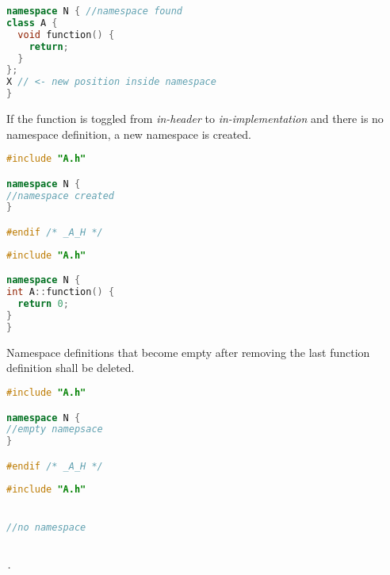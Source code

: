 \begin{lstlisting}[caption={A.h},label={namspac},language=C++]
namespace N { //namespace found
class A {
  void function() {
    return;
  }
};
X // <- new position inside namespace
}
\end{lstlisting}

If the function is toggled from \textit{in-header} to \textit{in-implementation}
and there is no namespace definition, a new namespace is created.

\vspace{0.5cm}
\begin{minipage}{.48\textwidth}
\lstset{xrightmargin=0.5cm}
\begin{lstlisting}[caption={A.cpp, new name-\\space created},
label={addnamespace1}, language=C++]
#include "A.h"

namespace N {
//namespace created
}

#endif /* _A_H */
\end{lstlisting}
\end{minipage}%
\begin{minipage}{.48\textwidth}
\lstset{xleftmargin=0.5cm}
\begin{lstlisting}[caption={A.cpp, insterted \\function},
label={addnamespace2},language=C++]
#include "A.h"

namespace N {
int A::function() { 
  return 0;
}
}
\end{lstlisting}
\end{minipage}

Namespace definitions that become empty after removing the last function
definition shall be deleted.

\vspace{0.5cm}
\begin{minipage}{.48\textwidth}
\lstset{xrightmargin=0.5cm}
\begin{lstlisting}[caption={A.cpp, empty na-\\mespace},
label={delnamespace1}, language=C++]
#include "A.h"

namespace N {
//empty namepsace
}

#endif /* _A_H */
\end{lstlisting}
\end{minipage}%
\begin{minipage}{.48\textwidth}
\lstset{xleftmargin=0.5cm}
\begin{lstlisting}[caption={A.cpp, removed \\empty namepsace},
label={delnamespace2},language=C++]
#include "A.h"


//no namespace


.
\end{lstlisting}
\end{minipage}

